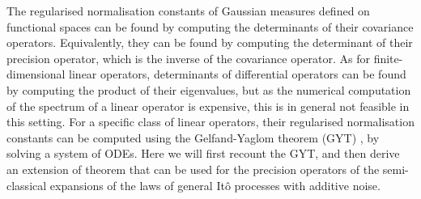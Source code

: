 \documentclass[withindex,glossary,techreport]{cam-thesis}
\begin{document}
\begin{appendices}
The regularised normalisation constants of Gaussian measures defined on functional
spaces can be found by computing the determinants of their covariance
operators. Equivalently, they can be found by computing
the determinant of their precision operator, which is the inverse
of the covariance operator. As for finite-dimensional linear operators,
determinants of differential operators can be found by computing the product of their
eigenvalues, but as the numerical computation of the spectrum of a linear operator is expensive, this is in general not feasible in this setting. For a specific class of linear operators, their regularised normalisation constants can be computed using the Gelfand-Yaglom theorem (GYT) \citep{gelfandIntegrationFunctionalSpaces1960, levitTheoremInfiniteProducts1977, dunneFunctionalDeterminantsQuantum2008}, by solving a system of ODEs. Here we will first recount the GYT, and then derive an extension of theorem that can be used for the precision operators of the semi-classical expansions of the laws of general It\^{o} processes with additive noise.


\end{appendices}
\end{document}
